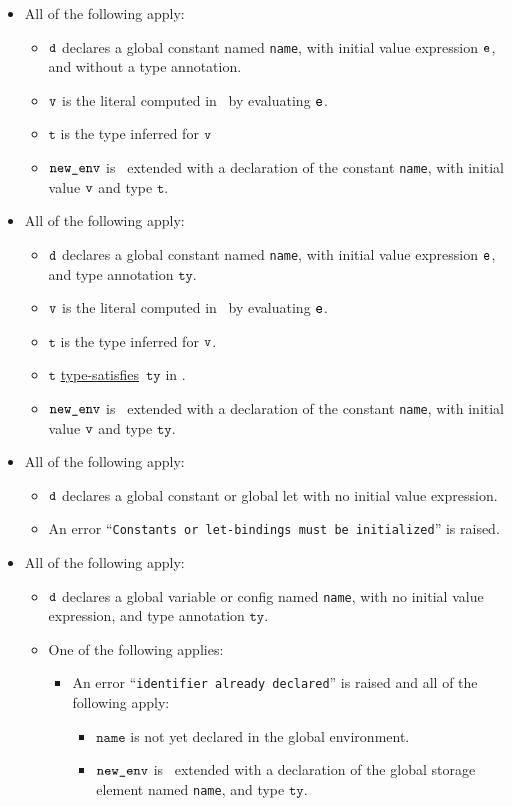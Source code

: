 \documentclass{book}
\newcommand\typesatisfies[0]{\hyperlink{def-typesatisfies}{type-satisfies}}
\newcommand\vt[0]{\texttt{t}}
\newcommand\tty[0]{\texttt{ty}}
\newcommand\name[0]{\texttt{name}}
\begin{document}
\begin{itemize}
  \item All of the following apply:
  \begin{itemize}
    \item $\texttt{d}$ declares a global constant named \name, with initial value expression $\texttt{e}$, and without a type annotation.
    \item $\texttt{v}$ is the literal computed in \tenv\ by evaluating $\texttt{e}$.
    \item $\vt$ is the type inferred for $\texttt{v}$
    \item $\texttt{new\_env}$ is \tenv\ extended with a declaration of the constant \name, with initial value $\texttt{v}$ and type $\vt$.
  \end{itemize}

  \item All of the following apply:
  \begin{itemize}
    \item $\texttt{d}$ declares a global constant named \name, with initial value expression $\texttt{e}$, and type annotation $\tty$.
    \item $\texttt{v}$ is the literal computed in \tenv\ by evaluating $\texttt{e}$.
    \item $\vt$ is the type inferred for $\texttt{v}$.
    \item $\vt$ \typesatisfies\  $\tty$ in \tenv.
    \item $\texttt{new\_env}$ is \tenv\ extended with a declaration of the constant \name, with initial value $\texttt{v}$ and type $\tty$.
  \end{itemize}

  \item All of the following apply:
  \begin{itemize}
    \item $\texttt{d}$ declares a global constant or global let with no initial value expression.
    \item An error ``\texttt{Constants or let-bindings must be initialized}'' is raised.
  \end{itemize}

  \item All of the following apply:
  \begin{itemize}
    \item $\texttt{d}$ declares a global variable or config named \name, with no initial value expression, and type annotation $\tty$.
    \item One of the following applies:
    \begin{itemize}
      \item An error ``\texttt{identifier already declared}'' is raised and all of the following apply:
      \begin{itemize}
        \item $\name$ is not yet declared in the global environment.
        \item $\texttt{new\_env}$ is \tenv\ extended with a declaration of the global storage element named \name, and type $\tty$.
      \end{itemize}
    \end{itemize}
  \end{itemize}


\end{itemize}
\end{document}
